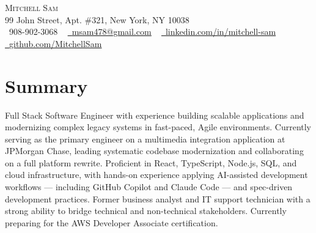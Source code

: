 \documentclass[letterpaper,11pt]{article}
\begin{document}
\begin{center}
    {\Huge \scshape Mitchell Sam} \\ \vspace{1pt}
    99 John Street, Apt. \#321, New York, NY 10038 \\ \vspace{1pt}
    \small \raisebox{-0.1\height}\faPhone\ 908-902-3068 ~ \href{mailto:msam478@gmail.com}{\raisebox{-0.2\height}\faEnvelope\  \underline{msam478@gmail.com}} ~
    \href{https://linkedin.com/in/mitchell-sam/}{\raisebox{-0.2\height}\faLinkedin\ \underline{linkedin.com/in/mitchell-sam}}  ~
    \href{https://github.com/MitchellSam}{\raisebox{-0.2\height}\faGithub\ \underline{github.com/MitchellSam}}
    \vspace{-8pt}
\end{center}

\section*{Summary}
Full Stack Software Engineer with experience building scalable applications and modernizing complex legacy systems in fast-paced, Agile environments. Currently serving as the primary engineer on a multimedia integration application at JPMorgan Chase, leading systematic codebase modernization and collaborating on a full platform rewrite. Proficient in React, TypeScript, Node.js, SQL, and cloud infrastructure, with hands-on experience applying AI-assisted development workflows --- including GitHub Copilot and Claude Code --- and spec-driven development practices. Former business analyst and IT support technician with a strong ability to bridge technical and non-technical stakeholders. Currently preparing for the AWS Developer Associate certification.

\end{document}
